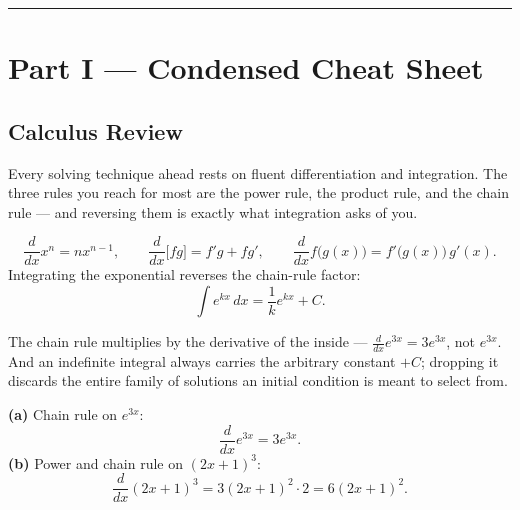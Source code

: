 \vspace{0.6em}
\hrule
\vspace{0.6em}

{}
\section*{Part I --- Condensed Cheat Sheet}
\setcounter{section}{1}   %

\subsection{Calculus Review}

Every solving technique ahead rests on fluent differentiation and integration.
The three rules you reach for most are the power rule, the product rule, and the
chain rule --- and reversing them is exactly what integration asks of you.

\begin{formulabox}
\[
    \frac{d}{dx}x^{n} = nx^{n-1}, \qquad
    \frac{d}{dx}\big[f g\big] = f'g + fg', \qquad
    \frac{d}{dx}f\big(g(x)\big) = f'\big(g(x)\big)\,g'(x).
\]
Integrating the exponential reverses the chain-rule factor:
\[
    \int e^{kx}\,dx = \frac{1}{k}e^{kx} + C.
\]
\end{formulabox}

\begin{warningbox}
The chain rule multiplies by the derivative of the inside --- $\frac{d}{dx}e^{3x}
= 3e^{3x}$, not $e^{3x}$. And an indefinite integral always carries the
arbitrary constant $+C$; dropping it discards the entire family of solutions an
initial condition is meant to select from.
\end{warningbox}

\begin{examplebox}
\textbf{(a)} Chain rule on $e^{3x}$:
\[ \frac{d}{dx}e^{3x} = 3e^{3x}. \]
\textbf{(b)} Power and chain rule on $(2x+1)^{3}$:
\[ \frac{d}{dx}(2x+1)^{3} = 3(2x+1)^{2}\cdot 2 = 6(2x+1)^{2}. \]
\end{examplebox}

